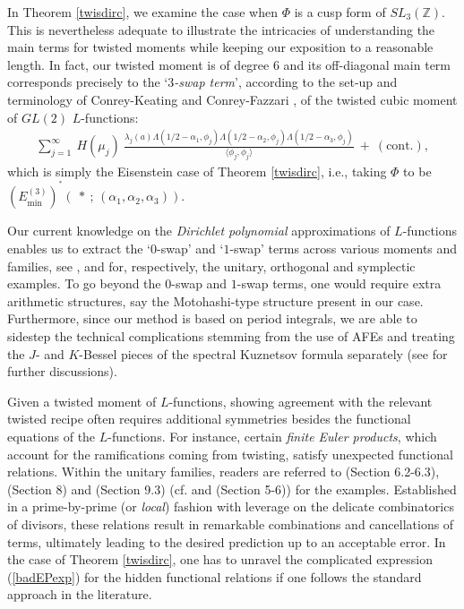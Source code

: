 \documentclass[11pt,reqno]{amsart}
\theoremstyle{definition}
\theoremstyle{definition}
\theoremstyle{remark}
\newcommand{\Z}{\ensuremath{\mathbb{Z}}}
\numberwithin{equation}{section}
\begin{document}
In  Theorem  \ref{twisdirc}, we  examine the case when  $\Phi$ is a cusp form of $SL_{3}(\Z)$. This is nevertheless adequate to illustrate  the intricacies of understanding the main terms for twisted moments while keeping our exposition to a reasonable length. In fact, our twisted moment is of degree $6$ and its off-diagonal main term corresponds precisely to  the  `\textit{$3$-swap term}',  according to   the set-up and terminology  of Conrey-Keating \cite{CK19, CK16, CK15a, CK15b, CK15c} and Conrey-Fazzari \cite{CF23},   of the twisted cubic moment of $GL(2)$ $L$-functions:
 \begin{align}\label{twiscub}
	\sum_{j=1}^{\infty} \ H(\mu_{j}) \  \frac{ \lambda_{j}(a)\Lambda(1/2- \alpha_{1}, \phi_{j})\Lambda(1/2- \alpha_{2}, \phi_{j})\Lambda(1/2- \alpha_{3}, \phi_{j})}{\langle \phi_{j}, \phi_{j}\rangle}  \ + \ (\text{cont.}), 
\end{align}
which is simply the Eisenstein case of Theorem \ref{twisdirc}, i.e., taking  $\Phi$ to be $(E_{\min}^{(3)})^{^*}( \ * \ ; \, (\alpha_{1}, \alpha_{2}, \alpha_{3}))$. 

Our current knowledge on the   \textit{Dirichlet polynomial} approximations of $L$-functions enables us to extract the `$0$-swap' and  `$1$-swap' terms across various moments and  families, see \cite{HN22, Ng21, BTB22+, CK15c}, \cite{CF23} and \cite{CR22+}  for, respectively, the  unitary, orthogonal and symplectic examples. To go  beyond the $0$-swap and $1$-swap terms, one would require extra arithmetic  structures,  say the Motohashi-type structure present in our case.  Furthermore,  since our method is based on  period integrals,   we are able to  sidestep the technical complications stemming from the use of AFEs and treating the  $J$- and  $K$-Bessel pieces of the spectral Kuznetsov formula separately (see  \cite{Kw23} for further discussions).  




Given a twisted moment of $L$-functions,  showing agreement with the relevant twisted recipe  often requires additional symmetries besides  the functional equations of  the $L$-functions. For instance,  certain \textit{finite Euler products}, which account for the ramifications coming  from twisting, satisfy  unexpected  functional relations. Within the unitary families, readers are referred to   \cite{HY10} (Section 6.2-6.3),  \cite{CIS19} (Section 8) and  \cite{BTB22+} (Section 9.3) (cf.  \cite{CK15c} and  \cite{HN22} (Section 5-6)) for the examples.   Established in a prime-by-prime (or \textit{local}) fashion with leverage on the delicate combinatorics of divisors,    these relations result in remarkable combinations and cancellations of terms,  ultimately leading to  the desired  prediction up to an acceptable error.    In the case of Theorem  \ref{twisdirc}, one has to unravel the complicated expression  (\ref{badEPexp}) for the hidden functional relations if one follows the standard approach in the literature. 
 
\end{document}
